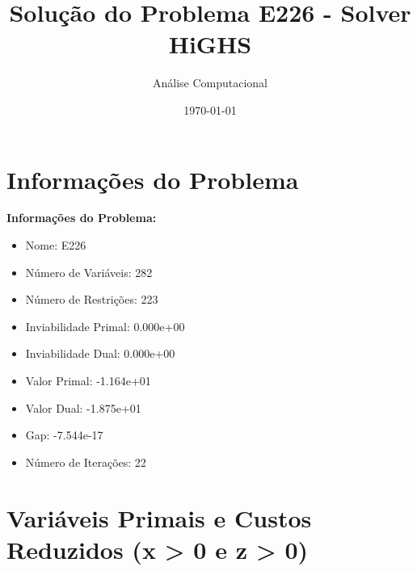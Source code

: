 \documentclass[12pt]{article}
\title{Solução do Problema E226 - Solver HiGHS}
\author{Análise Computacional}
\date{\today}
\begin{document}
\maketitle

\section{Informações do Problema}

\textbf{Informações do Problema:}
\begin{itemize}
\item Nome: E226
\item Número de Variáveis: 282
\item Número de Restrições: 223
\item Inviabilidade Primal: 0.000e+00
\item Inviabilidade Dual: 0.000e+00
\item Valor Primal: -1.164e+01
\item Valor Dual: -1.875e+01
\item Gap: -7.544e-17
\item Número de Iterações: 22
\end{itemize}


\section{Variáveis Primais e Custos Reduzidos (x > 0 e z > 0)}
\end{document}

